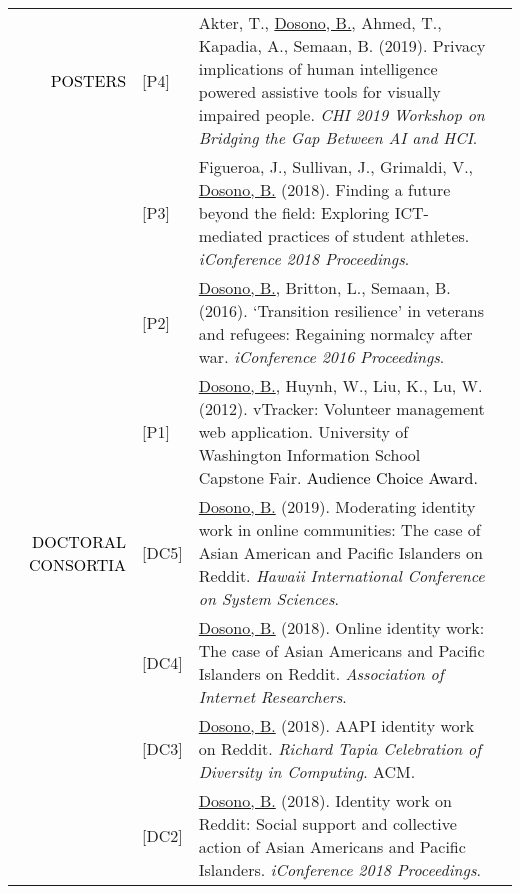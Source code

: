\documentclass[12pt]{article}
\begin{document}
{{\begin{longtable}{Rp{1.0in}p{0.25in}p{4.75in}}
\textcolor{black}{\footnotesize{\uppercase{Posters}}} 
& \footnotesize{[P4]} & Akter, T., \href{https://www.usenix.org/conference/soups2019}{{Dosono, B.}}, Ahmed, T., Kapadia, A., Semaan, B. (2019). Privacy implications of human intelligence powered assistive tools for visually impaired people. \textit{CHI 2019 Workshop on Bridging the Gap Between AI and HCI}. \\

& \footnotesize{[P3]} & Figueroa, J., Sullivan, J., Grimaldi, V., \href{https://www.ideals.illinois.edu/handle/2142/100251}{{Dosono, B.}} (2018). Finding a future beyond the field: Exploring ICT-mediated practices of student athletes. \textit{iConference 2018 Proceedings}. \\

& \footnotesize{[P2]} & \href{https://doi.org/10.9776/16575}{{Dosono, B.}}, Britton, L., Semaan, B. (2016). `Transition resilience' in veterans and refugees: Regaining normalcy after war. \textit{iConference 2016 Proceedings}. \\

& \footnotesize{[P1]} & \href{http://youtu.be/i5US90lHIac}{{Dosono, B.}}, Huynh, W., Liu, K., Lu, W. (2012). vTracker: Volunteer management web application. University of Washington Information School Capstone Fair. \textcolor{black}{Audience Choice Award.} \\

\textcolor{black}{\footnotesize{\uppercase{Doctoral Consortia}}} & \footnotesize{[DC5]} & \href{http://hicss.hawaii.edu/doctoral-consortium/}{{Dosono, B.}} (2019). Moderating identity work in online communities: The case of Asian American and Pacific Islanders on Reddit. \textit{Hawaii International Conference on System Sciences}. \\

& \footnotesize{[DC4]} & \href{https://aoir.org/}{{Dosono, B.}} (2018). Online identity work: The case of Asian Americans and Pacific Islanders on Reddit. \textit{Association of Internet Researchers}. \\

& \footnotesize{[DC3]} & \href{http://tapiaconference.org/schedule/wednesday-september-19-2018/100pm-500pm/doctoral-consortium/aapi-identity-work-on-reddit-toward-social-support-and-collective-action/}{{Dosono, B.}} (2018). AAPI identity work on Reddit. \textit{Richard Tapia Celebration of Diversity in Computing}. ACM. \\

& \footnotesize{[DC2]} & \href{https://ischools.org/the-iconference/program/doctoral-colloquium/2018-doctoral-colloquium/}{{Dosono, B.}} (2018). Identity work on Reddit: Social support and collective action of Asian Americans and Pacific Islanders. \textit{iConference 2018 Proceedings}. \\


\end{longtable}}}
\end{document}
